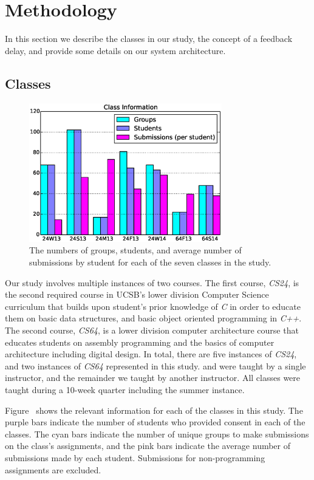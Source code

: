 \section{Methodology} 

In this section we describe the classes in our study, the concept of a feedback
delay, and provide some details on our system architecture.

\subsection{Classes}

\begin{figure}[!t]
\centering \includegraphics[width=3.3in]{graphs/Class_Information.eps}
\caption{The numbers of groups, students, and average number of submissions by
  student for each of the seven classes in the study.}
\end{figure}

Our study involves multiple instances of two courses. The first course,
\emph{CS24}, is the second required course in UCSB's lower division Computer
Science curriculum that builds upon student's prior knowledge of \emph{C} in
order to educate them on basic data structures, and basic object oriented
programming in \emph{C++}. The second course, \emph{CS64}, is a lower division
computer architecture course that educates students on assembly programming and
the basics of computer architecture including digital design. In total, there
are five instances of \emph{CS24}, and two instances of \emph{CS64} represented
in this study.  and  were taught by a single instructor,
and the remainder we taught by another instructor. All classes were taught
during a 10-week quarter including the summer instance.

Figure~ shows the relevant information for each of the
classes in this study. The purple bars indicate the number of students who
provided consent in each of the classes. The cyan bars indicate the number of
unique groups to make submissions on the class's assignments, and the pink bars
indicate the average number of submissions made by each student. Submissions
for non-programming assignments are excluded.

